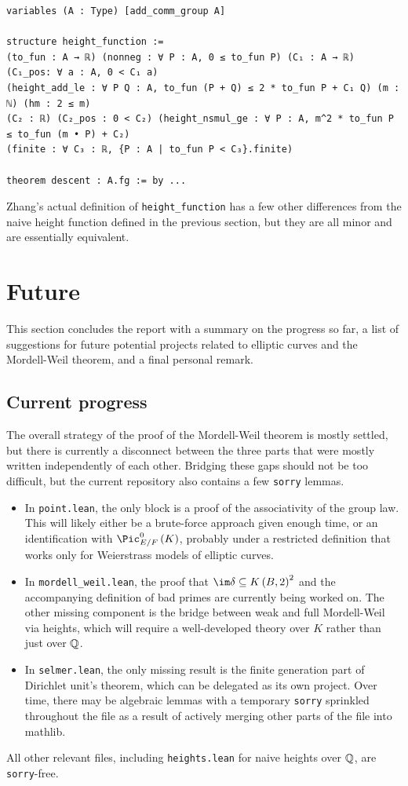 \begin{lstlisting}[frame=single]
variables (A : Type) [add_comm_group A]

structure height_function :=
(to_fun : A → ℝ) (nonneg : ∀ P : A, 0 ≤ to_fun P) (C₁ : A → ℝ) (C₁_pos: ∀ a : A, 0 < C₁ a)
(height_add_le : ∀ P Q : A, to_fun (P + Q) ≤ 2 * to_fun P + C₁ Q) (m : ℕ) (hm : 2 ≤ m)
(C₂ : ℝ) (C₂_pos : 0 < C₂) (height_nsmul_ge : ∀ P : A, m^2 * to_fun P ≤ to_fun (m • P) + C₂)
(finite : ∀ C₃ : ℝ, {P : A | to_fun P < C₃}.finite)

theorem descent : A.fg := by ...
\end{lstlisting}

Zhang's actual definition of \texttt{height\_function} has a few other differences from the naive height function defined in the previous section, but they are all minor and are essentially equivalent.

\pagebreak

\section{Future}

This section concludes the report with a summary on the progress so far, a list of suggestions for future potential projects related to elliptic curves and the Mordell-Weil theorem, and a final personal remark.

\subsection{Current progress}

The overall strategy of the proof of the Mordell-Weil theorem is mostly settled, but there is currently a disconnect between the three parts that were mostly written independently of each other. Bridging these gaps should not be too difficult, but the current repository also contains a few \texttt{sorry} lemmas.
\begin{itemize}
\item In \texttt{point.lean}, the only block is a proof of the associativity of the group law. This will likely either be a brute-force approach given enough time, or an identification with $ \Pic_{E / F}^0\br{K} $, probably under a restricted definition that works only for Weierstrass models of elliptic curves.
\item In \texttt{mordell\_weil.lean}, the proof that $ \im \delta \subseteq K\br{B, 2}^2 $ and the accompanying definition of bad primes are currently being worked on. The other missing component is the bridge between weak and full Mordell-Weil via heights, which will require a well-developed theory over $ K $ rather than just over $ \mathbb{Q} $.
\item In \texttt{selmer.lean}, the only missing result is the finite generation part of Dirichlet unit's theorem, which can be delegated as its own project. Over time, there may be algebraic lemmas with a temporary \texttt{sorry} sprinkled throughout the file as a result of actively merging other parts of the file into mathlib.
\end{itemize}
All other relevant files, including \texttt{heights.lean} for naive heights over $ \mathbb{Q} $, are \texttt{sorry}-free.


